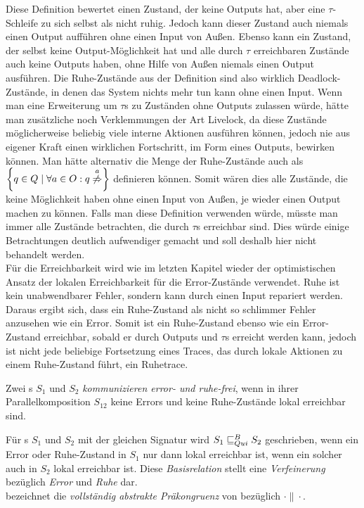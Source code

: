 Diese Definition bewertet einen Zustand, der keine Outputs hat, aber eine
$\tau$-Schleife zu sich selbst als nicht ruhig. Jedoch kann dieser Zustand auch
niemals einen Output aufführen ohne einen Input von Außen. Ebenso kann ein
Zustand, der selbst keine Output-Möglichkeit hat und alle durch $\tau$
erreichbaren Zustände auch keine Outputs haben, ohne Hilfe von Außen niemals
einen Output ausführen. Die Ruhe-Zustände aus der Definition sind also
wirklich Deadlock-Zustände, in denen das System nichts mehr tun kann ohne einen
Input. Wenn man eine Erweiterung um $\tau$s zu Zuständen
ohne Outputs zulassen würde, hätte man zusätzliche noch Verklemmungen der Art
Livelock, da diese Zustände möglicherweise beliebig viele interne Aktionen
ausführen können, jedoch nie aus eigener Kraft einen wirklichen Fortschritt, im
Form eines Outputs, bewirken können. Man hätte alternativ die Menge der
Ruhe-Zustände auch als $\left\{q\in Q\mid \forall a\in O: q
\overset{a}{\not{\hspace{-0.1cm}\Rightarrow}}\right\}$ definieren können. Somit
wären dies alle Zustände, die keine Möglichkeit haben ohne einen Input von
Außen, je wieder einen Output machen zu können. Falls man diese Definition
verwenden würde, müsste man immer alle Zustände betrachten, die durch $\tau$s
erreichbar sind. Dies würde einige Betrachtungen deutlich aufwendiger gemacht
und soll deshalb hier nicht behandelt werden.\\
Für die Erreichbarkeit wird wie im letzten Kapitel wieder der
optimistischen Ansatz der lokalen Erreichbarkeit für die Error-Zustände
verwendet. Ruhe ist kein unabwendbarer Fehler, sondern kann durch einen Input
repariert werden. Daraus ergibt sich, dass ein Ruhe-Zustand als nicht so
\glqq{}schlimmer Fehler\grqq{} anzusehen wie ein Error. Somit ist ein
Ruhe-Zustand ebenso wie ein Error-Zustand erreichbar, sobald er durch Outputs
und $\tau$s erreicht werden kann, jedoch ist nicht jede beliebige Fortsetzung
eines Traces, das durch lokale Aktionen zu einem Ruhe-Zustand führt, ein
Ruhetrace.

\begin{Def}
  Zwei \EIO{}s $S_1$ und $S_2$ \emph{kommunizieren error- und ruhe-frei}, wenn
  in ihrer Parallelkomposition $S_{12}$ keine Errors und keine Ruhe-Zustände
  lokal erreichbar sind.
\end{Def}

\begin{Def}
\label{DefQuiBasisrel}
  Für \EIO{}s $S_1$ und $S_2$ mit der gleichen Signatur wird
  $S_1\sqsubseteq _{Qui}^B S_2$ geschrieben, wenn ein Error oder Ruhe-Zustand in $S_1$ nur
  dann lokal erreichbar ist, wenn ein solcher auch in $S_2$ lokal erreichbar
  ist. Diese \emph{Basisrelation} stellt eine \emph{Verfeinerung} bezüglich
  \emph{Error} und \emph{Ruhe} dar.\\
  \QCRel{} bezeichnet die \emph{vollständig abstrakte Präkongruenz} von
  \QBRel{} bezüglich $\cdot\|\cdot$.
\end{Def}


